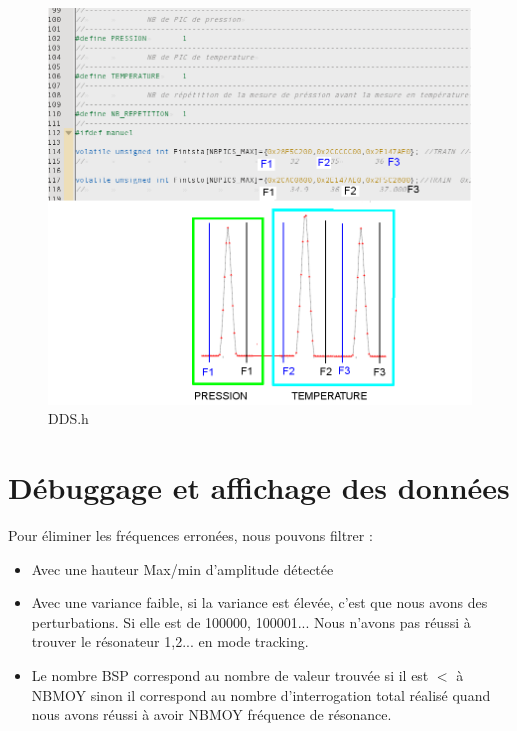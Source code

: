 \documentclass[a4paper]{article}
\begin{document}
\begin{figure}[h!tb]
\includegraphics[width=\linewidth]{DDSH}
\caption{DDS.h}
\label{hw3}
\end{figure}

\section{D\'ebuggage et affichage des donn\'ees}
Pour \'eliminer les fr\'equences  erron\'ees, nous pouvons filtrer :
\begin{itemize}
\item Avec une hauteur Max/min d'amplitude d\'etect\'ee
\item Avec une variance faible, si la variance est \'elev\'ee, c'est que nous avons des perturbations. Si elle est de 100000, 100001... Nous n'avons 
pas r\'eussi \`a trouver le r\'esonateur 1,2... en mode tracking.
\item Le nombre BSP  correspond au nombre de valeur trouv\'ee si il est $<$ \`a NBMOY sinon il correspond au nombre d'interrogation total r\'ealis\'e 
quand nous avons r\'eussi \`a avoir NBMOY fr\'equence de r\'esonance.

\end{itemize}
\end{document}
